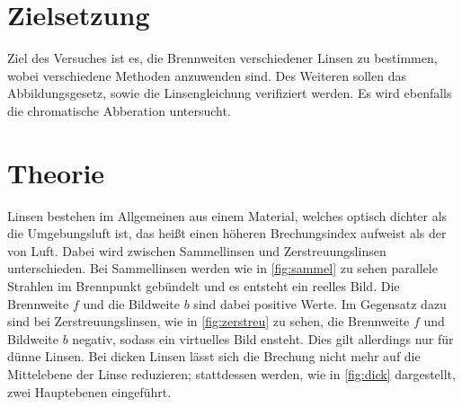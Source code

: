 \section{Zielsetzung}
    Ziel des Versuches ist es, die Brennweiten verschiedener Linsen zu bestimmen, wobei verschiedene Methoden anzuwenden sind. Des Weiteren 
    sollen das Abbildungsgesetz, sowie die Linsengleichung verifiziert werden. Es wird ebenfalls die chromatische Abberation untersucht.

\section{Theorie}
\label{sec:theorie}
    Linsen bestehen im Allgemeinen aus einem Material, welches optisch dichter als die Umgebungsluft ist, das heißt einen höheren 
    Brechungsindex aufweist als der von Luft. Dabei wird zwischen Sammellinsen und Zerstreuungslinsen unterschieden. Bei Sammellinsen 
    werden wie in \autoref{fig:sammel} zu sehen parallele Strahlen im Brennpunkt gebündelt und es entsteht ein reelles Bild. Die 
    Brennweite $f$ und die Bildweite $b$ sind dabei positive Werte. Im Gegensatz dazu sind bei Zerstreuungslinsen, wie in
    \autoref{fig:zerstreu} zu sehen, die Brennweite $f$ und Bildweite $b$ negativ, sodass ein virtuelles Bild ensteht.
    Dies gilt allerdings nur für dünne Linsen. Bei dicken Linsen lässt sich die Brechung nicht mehr auf die Mittelebene der
    Linse reduzieren; stattdessen werden, wie in \autoref{fig:dick} dargestellt, zwei Hauptebenen eingeführt.
